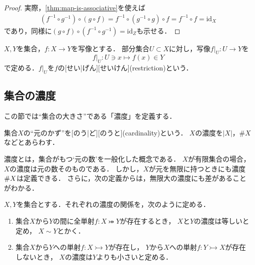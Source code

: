 \documentclass[../sotsu.tex]{subfiles}
\begin{document}
\begin{proof}
    実際，\cref{thm:map-is-associative}を使えば
    \begin{gather*}
        (f^{-1} \circ g^{-1}) \circ (g \circ f)
            = f^{-1} \circ (g^{-1} \circ g) \circ f
            = f^{-1} \circ f
            = \mathrm{id}_X
    \end{gather*}
    であり，同様に$(g \circ f) \circ (f^{-1} \circ g^{-1}) = \mathrm{id}_Z$も示せる．
\end{proof}




\begin{definition}[写像の制限]
    \label{dfn:restriction}
    $X, Y$を集合，$f \colon X \to Y$を写像とする．
    部分集合$U \subset X$に対し，写像$f \vert_{U} \colon U \to Y$を
    \begin{equation*}
        f \vert_U  \colon  U \ni x \longmapsto f(x) \in Y
    \end{equation*}
    で定める．$f \vert_U$を$f$の[せい|げん][せいけん](restriction)という．
\end{definition}


\subsection{集合の濃度}

この節では``集合の大きさ''である「濃度」を定義する．


\begin{definition}
    集合$X$の``元のかず''を[のう|ど][のうと](cardinality)という．
    $X$の濃度を$\lvert X \rvert$，$\# X$などとあらわす．
\end{definition}

濃度とは，集合がもつ`元の数'を一般化した概念である．
$X$が有限集合の場合，$X$の濃度は元の数そのものである．
しかし，$X$が元を無限に持つときにも濃度$\# X$は定義できる．
さらに，次の定義からは，無限大の濃度にも差があることがわかる．

\begin{definition}[濃度の大小]
    $X, Y$を集合とする．それぞれの濃度の関係を，次のように定める．
    \begin{enumerate}
        \item 集合$X$から$Y$の間に全単射$f \colon X \twoheadrightarrowtail Y$が存在するとき，
            $X$と$Y$の濃度は等しいと定め，
            $X \sim Y$とかく．
        \item 集合$X$から$Y$への単射$f \colon X \rightarrowtail Y$が存在し，
            $Y$から$X$への単射$f \colon Y \rightarrowtail X$が存在しないとき，
            $X$の濃度は$Y$よりも小さいと定める．
    \end{enumerate}
\end{definition}
\end{document}
